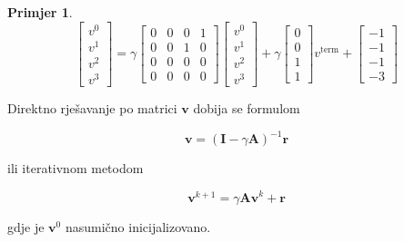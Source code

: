\documentclass[12pt]{IEEEtran}
\numberwithin{equation}{subsection}
\numberwithin{figure}{subsection}
\theoremstyle{definition}
\newtheorem{example}{Primjer}
\numberwithin{example}{section}
\begin{document}
\begin{example}
    \begin{equation}
        \begin{bmatrix}
            v^{0} \\
            v^{1} \\
            v^{2} \\
            v^{3}
        \end{bmatrix} =
        \gamma
        \begin{bmatrix}
            0 & 0 & 0 & 1 \\
            0 & 0 & 1 & 0 \\
            0 & 0 & 0 & 0 \\
            0 & 0 & 0 & 0
        \end{bmatrix}
        \begin{bmatrix}
            v^{0} \\
            v^{1} \\
            v^{2} \\
            v^{3}
        \end{bmatrix}
        + \gamma
        \begin{bmatrix}
            0 \\
            0 \\
            1 \\
            1
        \end{bmatrix}
        v^{\text{term}}
        +
        \begin{bmatrix}
            -1 \\
            -1 \\
            -1 \\
            -3
        \end{bmatrix}
    \end{equation}

    Direktno rje\v{s}avanje po matrici $\mathbf{v}$ dobija se formulom

    \begin{equation}
        \mathbf{v} = (\mathbf{I} - \gamma \mathbf{A})^{-1}\mathbf{r}
    \end{equation}

    ili iterativnom metodom

    \begin{equation}
        \mathbf{v}^{k + 1} = \gamma \mathbf{Av}^{k} + \mathbf{r}
    \end{equation}

    gdje je $\mathbf{v}^{0}$ nasumi\v{c}no inicijalizovano.

\end{example}
\end{document}

